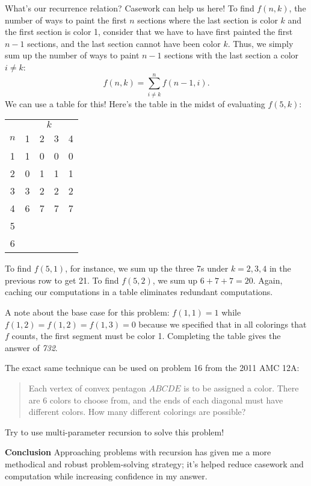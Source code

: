 \documentclass{article}
\begin{document}
\begin{multicols}{3}
What's our recurrence relation? Casework can help us here! To find $f(n, k)$, the number of ways to paint the first $n$ sections where the last section is color $k$ and the first section is color 1, consider that we have to have first painted the first $n - 1$ sections, and the last section cannot have been color $k$. Thus, we simply sum up the number of ways to paint $n - 1$ sections with the last section a color $i \neq k$:
$$f(n, k) = \sum_{i \neq k}^{n} f(n - 1, i).$$
We can use a table for this! Here's the table in the midst of evaluating $f(5, k)$:
\begin{center}
    \begin{tabular}{c|c|c|c|c }
        \multicolumn{1}{c}{}&\multicolumn{4}{c}{\(k\)}\\
        \(n\)&1 & 2 & 3& 4 \\ \hline
        1& 1 & 0 & 0 & 0\\
        2 & 0 & 1 & 1 & 1 \\
        3& 3 & 2 & 2 & 2 \\
        4 & 6 & 7 & 7 & 7 \\
        5 & & & & \\
        6& & & & \\
    \end{tabular}
\end{center}
To find $f(5, 1)$, for instance, we sum up the three 7s under $k=2, 3, 4$ in the previous row to get 21. To find $f(5, 2)$, we sum up $6 + 7 + 7 = 20$. Again, caching our computations in a table eliminates redundant computations.

A note about the base case for this problem: $f(1, 1) = 1$ while $f(1, 2) = f(1, 2) = f(1, 3) = 0$ because we specified that in all colorings that $f$ counts, the first segment must be color 1. Completing the table gives the answer of \textit{732}.

The exact same technique can be used on problem 16 from the 2011 AMC 12A:
\begin{quote}
    Each vertex of convex pentagon $ABCDE$ is to be assigned a color. There are $6$ colors to choose from, and the ends of each diagonal must have different colors. How many different colorings are possible?
\end{quote}
Try to use multi-parameter recursion to solve this problem!

\textbf{Conclusion} Approaching problems with recursion has given me a more methodical and robust problem-solving strategy; it's helped reduce casework and computation while increasing confidence in my answer.


\end{multicols}
\end{document}
